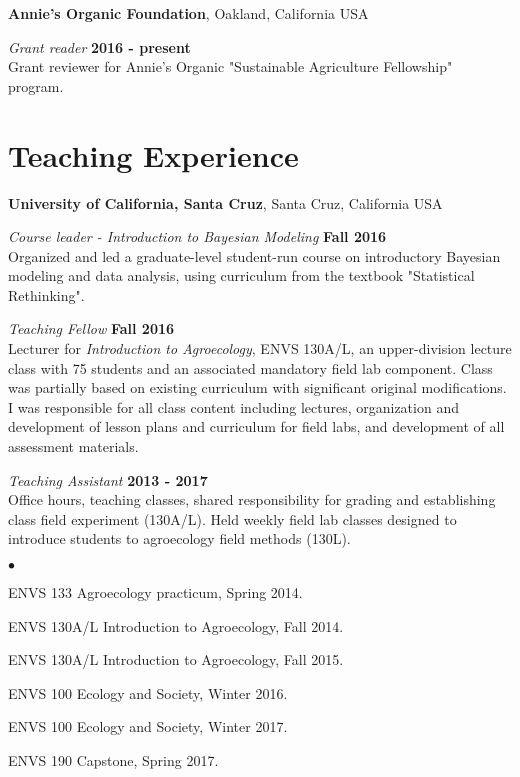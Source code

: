\documentclass{res}
\newenvironment{list2}{
	\begin{list}{$\bullet$}{%
			\setlength{\itemsep}{0in}
			\setlength{\parsep}{0in} \setlength{\parskip}{0in}
			\setlength{\topsep}{0in} \setlength{\partopsep}{0in} 
			\setlength{\leftmargin}{0.2in}}}{\end{list}}
\begin{document}
\begin{resume}
		\vspace*{.05in}  
		
		{\bf Annie's Organic Foundation}, Oakland, California USA
		
		\vspace{-.3cm}		
		{\em Grant reader} \hfill {\bf 2016 - present}\\
		Grant reviewer for Annie's Organic "Sustainable Agriculture Fellowship" program. 
		

		\section{\sc Teaching Experience}
		{\bf University of California, Santa Cruz}, Santa Cruz, California USA
		
		\vspace{-.3cm}
		{\em Course leader - Introduction to Bayesian Modeling} \hfill {\bf Fall 2016}\\
		Organized and led a graduate-level student-run course on introductory Bayesian modeling and data analysis, using curriculum from the textbook "Statistical Rethinking". 
		
		
		\vspace{-.3cm}
		{\em Teaching Fellow} \hfill {\bf Fall 2016}\\
		Lecturer for \textit{Introduction to Agroecology}, ENVS 130A/L, an upper-division lecture class with 75 students and an associated mandatory field lab component. Class was partially based on existing curriculum with significant original modifications. I was responsible for all class content including lectures, organization and development of lesson plans and curriculum for field labs, and development of all assessment materials. 
		
		{\em Teaching Assistant} \hfill {\bf 2013 - 2017}\\
		Office hours, teaching classes, shared responsibility for grading and establishing class field experiment (130A/L). Held weekly field lab classes designed to introduce students to agroecology field methods (130L).
		\begin{list2}
			\item ENVS 133 Agroecology practicum, Spring 2014.
			\item ENVS 130A/L Introduction to Agroecology, Fall 2014.
			\item ENVS 130A/L Introduction to Agroecology, Fall 2015.		
			\item ENVS 100 Ecology and Society, Winter 2016.	
			\item ENVS 100 Ecology and Society, Winter 2017.
			\item ENVS 190 Capstone, Spring 2017.
		\end{list2}
		

\end{resume}
\end{document}
